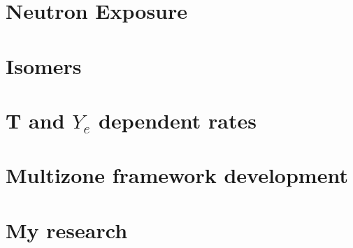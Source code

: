 \documentclass{article}
\begin{document}
\section*{Neutron Exposure}
\section*{Isomers}
\section*{T and $Y_{e}$ dependent rates}
\section*{Multizone framework development}
\section*{My research}

\singlespacing



\end{document}

